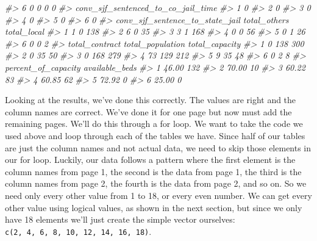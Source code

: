 \documentclass[
]{krantz}
\makeatletter
\newenvironment{Shaded}{\begin{snugshade}}{\end{snugshade}}
\newcommand{\CommentTok}[1]{\textcolor[rgb]{0.37,0.37,0.37}{\textit{#1}}}
\newenvironment{kframe}{%
\medskip{}
\setlength{\fboxsep}{.8em}
 \def\at@end@of@kframe{}%
 \ifinner\ifhmode%
  \def\at@end@of@kframe{\end{minipage}}%
  \begin{minipage}{\columnwidth}%
 \fi\fi%
 \def\FrameCommand##1{\hskip\@totalleftmargin \hskip-\fboxsep
 \colorbox{shadecolor}{##1}\hskip-\fboxsep
     \hskip-\linewidth \hskip-\@totalleftmargin \hskip\columnwidth}%
 \MakeFramed {\advance\hsize-\width
   \@totalleftmargin\z@ \linewidth\hsize
   \@setminipage}}%
 {\par\unskip\endMakeFramed%
 \at@end@of@kframe}
\renewenvironment{Shaded}{\begin{kframe}}{\end{kframe}}
\makeatother
\begin{document}
\begin{Shaded}
\begin{Highlighting}[]
\CommentTok{\#\textgreater{} 6         0              0       0            0}
\CommentTok{\#\textgreater{}   conv\_sjf\_sentenced\_to\_co\_jail\_time}
\CommentTok{\#\textgreater{} 1                                  0}
\CommentTok{\#\textgreater{} 2                                  0}
\CommentTok{\#\textgreater{} 3                                  0}
\CommentTok{\#\textgreater{} 4                                  0}
\CommentTok{\#\textgreater{} 5                                  0}
\CommentTok{\#\textgreater{} 6                                  0}
\CommentTok{\#\textgreater{}   conv\_sjf\_sentence\_to\_state\_jail total\_others total\_local}
\CommentTok{\#\textgreater{} 1                               1            0         138}
\CommentTok{\#\textgreater{} 2                               6            0          35}
\CommentTok{\#\textgreater{} 3                               3            1         168}
\CommentTok{\#\textgreater{} 4                               0            0          56}
\CommentTok{\#\textgreater{} 5                               0            1          26}
\CommentTok{\#\textgreater{} 6                               0            0           2}
\CommentTok{\#\textgreater{}   total\_contract total\_population total\_capacity}
\CommentTok{\#\textgreater{} 1              0              138            300}
\CommentTok{\#\textgreater{} 2              0               35             50}
\CommentTok{\#\textgreater{} 3              0              168            279}
\CommentTok{\#\textgreater{} 4             73              129            212}
\CommentTok{\#\textgreater{} 5              9               35             48}
\CommentTok{\#\textgreater{} 6              0                2              8}
\CommentTok{\#\textgreater{}   percent\_of\_capacity available\_beds}
\CommentTok{\#\textgreater{} 1               46.00            132}
\CommentTok{\#\textgreater{} 2               70.00             10}
\CommentTok{\#\textgreater{} 3               60.22             83}
\CommentTok{\#\textgreater{} 4               60.85             62}
\CommentTok{\#\textgreater{} 5               72.92              0}
\CommentTok{\#\textgreater{} 6               25.00              0}
\end{Highlighting}
\end{Shaded}

Looking at the results, we've done this correctly. The
values are right and the column names are correct. We've
done it for one page but now must add the remaining pages.
We'll do this through a for loop. We want to take the code
we used above and loop through each of the tables we have.
Since half of our tables are just the column names and not
actual data, we need to skip those elements in our for loop.
Luckily, our data follows a pattern where the first element
is the column names from page 1, the second is the data from
page 1, the third is the column names from page 2, the
fourth is the data from page 2, and so on. So we need only
every other value from 1 to 18, or every even number. We can
get every other value using logical values, as shown in the
next section, but since we only have 18 elements we'll just
create the simple vector ourselves:
\texttt{c(2,\ 4,\ 6,\ 8,\ 10,\ 12,\ 14,\ 16,\ 18)}.
\end{document}
